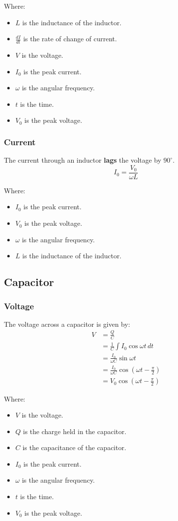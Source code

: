 \documentclass[11pt]{article}
\begin{document}
Where:
\begin{itemize}
\item \(L\) is the inductance of the inductor.
\item \(\frac{dI}{dt}\) is the rate of change of current.
\item \(V\) is the voltage.
\item \(I_0\) is the peak current.
\item \(\omega\) is the angular frequency.
\item \(t\) is the time.
\item \(V_0\) is the peak voltage.
\end{itemize}
\subsubsection{Current}
\label{sec:org6fe0757}
The current through an inductor \textbf{lags} the voltage by \(90^{\circ}\).
\[I_0 = \frac{V_0}{\omega L}\]

Where:
\begin{itemize}
\item \(I_0\) is the peak current.
\item \(V_0\) is the peak voltage.
\item \(\omega\) is the angular frequency.
\item \(L\) is the inductance of the inductor.
\end{itemize}
\subsection{Capacitor}
\label{sec:orga488c6c}

\subsubsection{Voltage}
\label{sec:org75e0f51}
The voltage across a capacitor is given by:
\begin{align*}
V &= \frac{Q}{C} \\
&= \frac{1}{C} \int I_0 \cos \omega t \, dt \\
&= \frac{I_0}{\omega C} \sin \omega t \\
&= \frac{I_0}{\omega C} \cos \left(\omega t - \frac{\pi}{2} \right) \\
&= V_0 \cos \left( \omega t - \frac{\pi}{2} \right)
\end{align*}

Where:
\begin{itemize}
\item \(V\) is the voltage.
\item \(Q\) is the charge held in the capacitor.
\item \(C\) is the capacitance of the capacitor.
\item \(I_0\) is the peak current.
\item \(\omega\) is the angular frequency.
\item \(t\) is the time.
\item \(V_0\) is the peak voltage.
\end{itemize}
\end{document}
